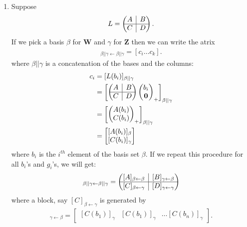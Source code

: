 \documentclass{article}
\theoremstyle{definition}
\newcommand{\W}{\mathbf{W}}
\newcommand{\Z}{\mathbf{Z}}
\newcommand{\rvline}{\hspace*{-\arraycolsep}\vline\hspace*{-\arraycolsep}}
\begin{document}
\begin{enumerate}
	
	\item Suppose 
	\begin{align*}
	L = \begin{pmatrix}
	A & \rvline & B\\
	\hline
	C & \rvline & D
	\end{pmatrix}.
	\end{align*}
	If we pick a basis $\beta$ for $\W$ and $\gamma$ for $\Z$ then we can write the atrix
	\begin{align*}
	[L]_{\beta||\gamma \leftarrow \beta||\gamma} = [c_i \dots c_k].
	\end{align*}
	where $\beta||\gamma$ is a concatenation of the bases and the columns:
	\begin{align*}
	c_i &= [L(b_i)]_{\beta||\gamma}\\
	&= \begin{bmatrix}
	\begin{pmatrix}
	A & \rvline & B\\
	\hline
	C & \rvline & D
	\end{pmatrix} \begin{pmatrix}
	b_i \\ \mathbf{0}
	\end{pmatrix}_+
	\end{bmatrix}_{\beta||\gamma} \\
	&= \begin{bmatrix}
	\begin{pmatrix}
	A(b_i)\\
	C(b_i)
	\end{pmatrix}_+
	\end{bmatrix}_{\beta||\gamma}\\
	&= \begin{bmatrix}
	[A(b_i)]_\beta\\
	[C(b_i)]_\gamma
	\end{bmatrix}
	\end{align*}
	where $b_i$ is the $i^{th}$ element of the basis set $\beta$. If we repeat this procedure for all $b_i$'s and $g_i$'s, we will get:
	\begin{align*}
	[L]_{\beta||\gamma \leftarrow \beta||\gamma} = 
	\begin{pmatrix}
	[A]_{\beta\leftarrow \beta} & \rvline & [B]_{\gamma\leftarrow \beta}\\
	\hline
	[C]_{\beta\leftarrow \gamma} & \rvline & [D]_{\gamma\leftarrow \gamma}
	\end{pmatrix}
	\end{align*}
	where a block, say $[C]_{\beta\leftarrow\gamma}$ is generated by
	\begin{align*}
	[C]_{\gamma\leftarrow\beta} = \begin{bmatrix}
	[C(b_1)]_\gamma & [C(b_1)]_\gamma & \dots [C(b_n)]_\gamma
	\end{bmatrix}.
	\end{align*}
	
\end{enumerate}
\end{document}
